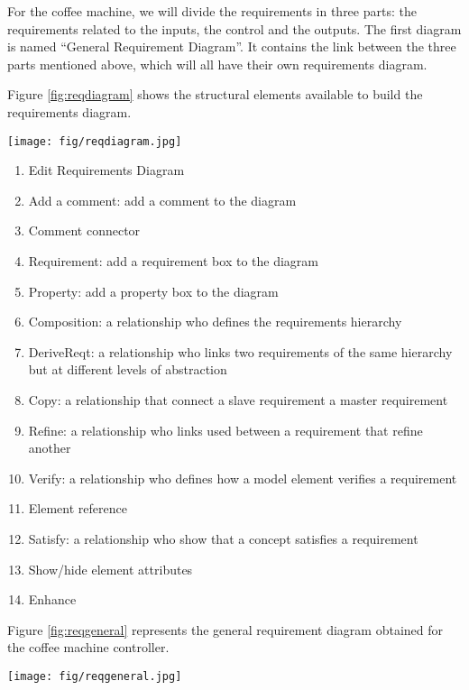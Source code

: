 \documentclass[12pt]{article}
\begin{document}
For the coffee machine, we will divide the requirements in three parts: the requirements related to the inputs, the control and the outputs.
The first diagram is named ``General Requirement Diagram''. It contains the link between the three parts mentioned above, which will all have their own requirements diagram. 
	
		Figure \ref{fig:reqdiagram} shows the structural elements available to build the requirements diagram.


\begin{figure*}[htbp]
\centering
\texttt{[image: fig/reqdiagram.jpg]}
\caption{Structural elements of the requirements diagram} \label{fig:reqdiagram}
\end{figure*}

\begin{enumerate}
\item Edit Requirements Diagram
\item Add a comment: add a comment to the diagram
\item Comment connector
\item Requirement: add a requirement box to the diagram
\item Property: add a property box to the diagram
\item Composition: a relationship who defines the requirements hierarchy
\item DeriveReqt: a relationship who links two requirements of the same hierarchy but at different levels of abstraction
\item Copy: a relationship that connect a slave requirement a master requirement
\item Refine: a relationship who links used between a requirement that refine another
\item Verify: a relationship who defines how a model element verifies a requirement
\item Element reference
\item Satisfy: a relationship who show that a concept satisfies a requirement
\item Show/hide element attributes
\item Enhance

\end{enumerate}

Figure \ref{fig:reqgeneral} represents the general requirement diagram obtained for the coffee machine controller.

\begin{figure*}[htbp]
\centering
\texttt{[image: fig/reqgeneral.jpg]}
\caption{General Requirement Diagram} \label{fig:reqgeneral}
\end{figure*}
\end{document}
